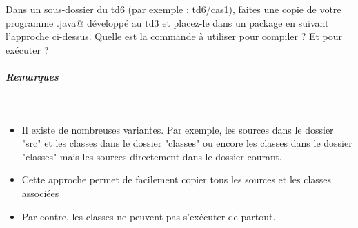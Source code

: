 \documentclass[a4paper,11pt]{article}
\begin{document}
		\begin{Exercice}{}
				Dans un sous-dossier du td6 (par exemple : td6/cas1), faites une copie de votre programme 
				\verb@Hello.java@ d\'evelopp\'e au td3 et placez-le dans un package en suivant l'approche ci-dessus.
				Quelle est la commande \`a utiliser pour compiler ? Et pour ex\'ecuter ?
		\end{Exercice}
			
           	 \par
        
			\par\medskip
			
		\subparagraph{Remarques} 
		
			\textcolor{white}{.} \par
					
			\begin{itemize}
				
				\item Il existe de nombreuses variantes. Par exemple, les sources dans le dossier
					"src" et les classes dans le dossier "classes" ou encore les classes dans le dossier "classes"
					mais les sources directement dans le dossier courant. 
				
				\item Cette approche permet de facilement copier tous les sources et les classes associ\'ees
				
				\item Par contre, les classes ne peuvent pas s'ex\'ecuter
					de partout.
			 	
			\end{itemize}
				
\end{document}
